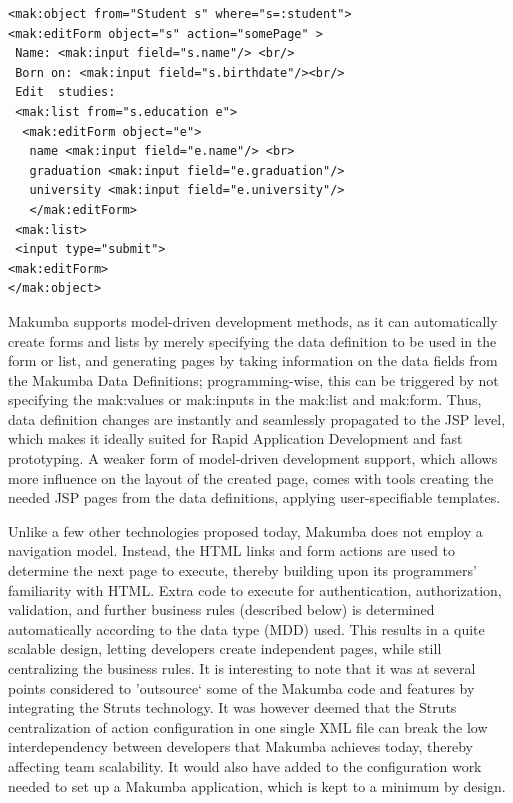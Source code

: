 \documentclass{chi2009}
\begin{document}
\lstset{basicstyle=\small, captionpos=b, caption=Example of changing data with the Makumba JSP tag library, label=form:mak, frame=shadowbox}
\begin{lstlisting}
<mak:object from="Student s" where="s=:student">
<mak:editForm object="s" action="somePage" >
 Name: <mak:input field="s.name"/> <br/>
 Born on: <mak:input field="s.birthdate"/><br/>
 Edit  studies:
 <mak:list from="s.education e"> 
  <mak:editForm object="e">
   name <mak:input field="e.name"/> <br>      
   graduation <mak:input field="e.graduation"/>
   university <mak:input field="e.university"/>
   </mak:editForm>
 <mak:list>
 <input type="submit">
<mak:editForm>
</mak:object>
\end{lstlisting}

Makumba supports model-driven development methods, as it can automatically create forms and lists by merely specifying the data definition to be used in the form or list, and generating pages by taking information on the data fields from the Makumba Data Definitions; programming-wise, this can be triggered by not specifying the mak:values or mak:inputs in the mak:list and mak:form. Thus, data definition changes are instantly and seamlessly propagated to the JSP level, which makes it ideally suited for Rapid Application Development and fast prototyping. A weaker form of model-driven development support, which allows more influence on the layout of the created page, comes with tools creating the needed JSP pages from the data definitions, applying user-specifiable templates.

Unlike a few other technologies proposed today, Makumba does not employ a navigation model. Instead, the HTML links and form actions are used to determine the next page to execute, thereby building upon its programmers' familiarity with HTML. Extra code to execute for authentication, authorization, validation, and further business rules (described below) is determined automatically according to the data type (MDD) used. This results in a quite scalable design, letting developers create independent pages, while still centralizing the business rules. It is interesting to note that it was at several points considered to 'outsource` some of the Makumba code and features by integrating the Struts technology. It was however deemed that the Struts centralization of action configuration in one single XML file can break the low interdependency between developers that Makumba achieves today, thereby affecting team scalability. It would also have added to the configuration work needed to set up a Makumba application, which is kept to a minimum by design.
\end{document}
